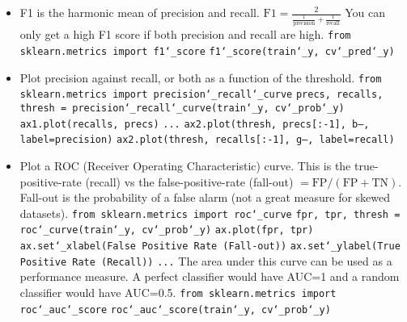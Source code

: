 \begin{itemize}
\item
F1 is the harmonic mean of precision and recall.
$\textrm{F1} = \frac{2}{\frac{1}{\textrm{precision}} + \frac{1}{\textrm{recall}}}$\newline
You can only get a high F1 score if both precision and recall are high.\newline
\texttt{from sklearn.metrics import f1\char`_score}\newline
\texttt{f1\char`_score(train\char`_y, cv\char`_pred\char`_y)}\newline

\item
Plot precision against recall, or both as a function of the threshold.\newline
\texttt{from sklearn.metrics import precision\char`_recall\char`_curve}\newline
\texttt{precs, recalls, thresh = precision\char`_recall\char`_curve(train\char`_y, cv\char`_prob\char`_y)}\newline
\texttt{ax1.plot(recalls, precs)}\newline
\texttt{...}\newline
\texttt{ax2.plot(thresh, precs[:-1], \textquotesingle b--\textquotesingle, label=\textquotesingle precision\textquotesingle)}\newline
\texttt{ax2.plot(thresh, recalls[:-1], \textquotesingle g--\textquotesingle, label=\textquotesingle recall\textquotesingle)}\newline

\item
Plot a ROC (Receiver Operating Characteristic) curve.\newline
This is the true-positive-rate (recall)
vs the false-positive-rate (fall-out)
$= \textrm{FP} / (\textrm{FP}+\textrm{TN})$.\newline
Fall-out is the probability of a false alarm (not a great measure for skewed datasets).\newline
\texttt{from sklearn.metrics import roc\char`_curve}\newline
\texttt{fpr, tpr, thresh = roc\char`_curve(train\char`_y, cv\char`_prob\char`_y)}\newline
\texttt{ax.plot(fpr, tpr)}\newline
\texttt{ax.set\char`_xlabel(\textquotesingle False Positive Rate (Fall-out)\textquotesingle)}\newline
\texttt{ax.set\char`_ylabel(\textquotesingle True Positive Rate (Recall)\textquotesingle)}\newline
\texttt{...}\newline
The area under this curve can be used as a performance measure.\newline
A perfect classifier would have AUC=1 and a random classifier would have AUC=0.5.
\texttt{from sklearn.metrics import roc\char`_auc\char`_score}\newline
\texttt{roc\char`_auc\char`_score(train\char`_y, cv\char`_prob\char`_y)}


\end{itemize}
